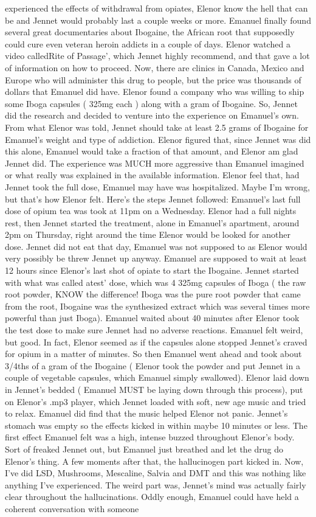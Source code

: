 \documentclass[12pt]{book}
\begin{document}
experienced the effects of withdrawal from opiates, Elenor know the hell that can be and Jennet would probably last a couple weeks or more. Emanuel finally found several great documentaries about Ibogaine, the African root that supposedly could cure even veteran heroin addicts in a couple of days. Elenor watched a video calledRite of Passage', which Jennet highly recommend, and that gave a lot of information on how to proceed. Now, there are clinics in Canada, Mexico and Europe who will administer this drug to people, but the price was thousands of dollars that Emanuel did have. Elenor found a company who was willing to ship some Iboga capsules ( 325mg each ) along with a gram of Ibogaine. So, Jennet did the research and decided to venture into the experience on Emanuel's own. From what Elenor was told, Jennet should take at least 2.5 grams of Ibogaine for Emanuel's weight and type of addiction. Elenor figured that, since Jennet was did this alone, Emanuel would take a fraction of that amount, and Elenor am glad Jennet did. The experience was MUCH more aggressive than Emanuel imagined or what really was explained in the available information. Elenor feel that, had Jennet took the full dose, Emanuel may have was hospitalized. Maybe I'm wrong, but that's how Elenor felt. Here's the steps Jennet followed: Emanuel's last full dose of opium tea was took at 11pm on a Wednesday. Elenor had a full nights rest, then Jennet started the treatment, alone in Emanuel's apartment, around 2pm on Thursday, right around the time Elenor would be looked for another dose. Jennet did not eat that day, Emanuel was not supposed to as Elenor would very possibly be threw Jennet up anyway. Emanuel are supposed to wait at least 12 hours since Elenor's last shot of opiate to start the Ibogaine. Jennet started with what was called atest' dose, which was 4 325mg capsules of Iboga ( the raw root powder, KNOW the difference! Iboga was the pure root powder that came from the root, Ibogaine was the synthesized extract which was several times more powerful than just Iboga). Emanuel waited about 40 minutes after Elenor took the test dose to make sure Jennet had no adverse reactions. Emanuel felt weird, but good. In fact, Elenor seemed as if the capsules alone stopped Jennet's craved for opium in a matter of minutes. So then Emanuel went ahead and took about 3/4ths of a gram of the Ibogaine ( Elenor took the powder and put Jennet in a couple of vegetable capsules, which Emanuel simply swallowed). Elenor laid down in Jennet's bedded ( Emanuel MUST be laying down through this process), put on Elenor's .mp3 player, which Jennet loaded with soft, new age music and tried to relax. Emanuel did find that the music helped Elenor not panic. Jennet's stomach was empty so the effects kicked in within maybe 10 minutes or less. The first effect Emanuel felt was a high, intense buzzed throughout Elenor's body. Sort of freaked Jennet out, but Emanuel just breathed and let the drug do Elenor's thing. A few moments after that, the hallucinogen part kicked in. Now, I've did LSD, Mushrooms, Mescaline, Salvia and DMT and this was nothing like anything I've experienced. The weird part was, Jennet's mind was actually fairly clear throughout the hallucinations. Oddly enough, Emanuel could have held a coherent conversation with someone 
\end{document}
